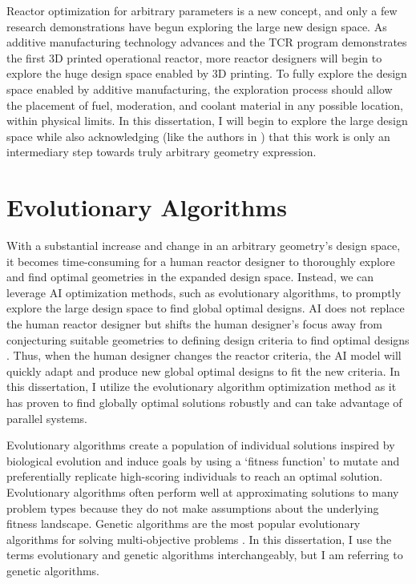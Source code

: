 Reactor optimization for arbitrary parameters is a new concept, and only a few 
research demonstrations have begun exploring the large new design space. 
As additive manufacturing technology advances and the \gls{TCR} program 
demonstrates the first 3D printed operational reactor, more reactor designers 
will begin to explore the huge design space enabled by 3D printing. 
To fully explore the design space enabled by additive manufacturing, the 
exploration process should allow the placement of fuel, moderation, and coolant 
material in any possible location, within physical limits. 
In this dissertation, I will begin to explore the large design space while 
also acknowledging (like the authors in \cite{sobes_artificial_2020}) that 
this work is only an intermediary step towards truly arbitrary geometry expression. 

\section{Evolutionary Algorithms} 
\label{sec:ea}
With a substantial increase and change in an arbitrary geometry's design space, 
it becomes time-consuming for a human reactor designer to thoroughly explore 
and find optimal geometries in the expanded design space. 
Instead, we can leverage \gls{AI} optimization methods, such as evolutionary 
algorithms, to promptly explore the large design space to find global optimal 
designs. 
\gls{AI} does not replace the human reactor designer but shifts the human 
designer's focus away from conjecturing suitable geometries to defining design 
criteria to find optimal designs \cite{sobes_artificial_2020}. 
Thus, when the human designer changes the reactor criteria, the \gls{AI} 
model will quickly adapt and produce new global optimal designs to fit the new 
criteria.  
In this dissertation, I utilize the evolutionary algorithm optimization method as 
it has proven to find globally optimal solutions robustly and can take 
advantage of parallel systems. 

Evolutionary algorithms create a population of individual solutions inspired 
by biological evolution and induce goals by using a `fitness function' to 
mutate and preferentially replicate high-scoring individuals to reach an 
optimal solution.
Evolutionary algorithms often perform well at approximating solutions to many 
problem types because they do not make assumptions about the 
underlying fitness landscape.
Genetic algorithms are the most popular evolutionary algorithms for solving 
multi-objective problems \cite{byrne_evolving_2014, krish_practical_2011}. 
In this dissertation, I use the terms evolutionary and genetic algorithms 
interchangeably, but I am referring to genetic algorithms.

